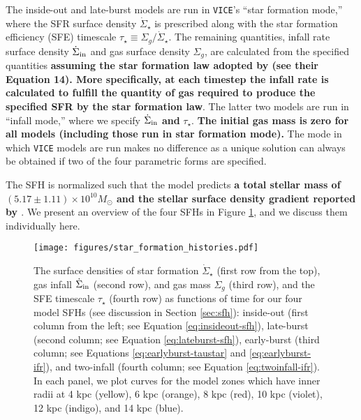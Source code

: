 \documentclass[twocolumn,twocolappendix,linenumbers]{aastex631}
\newcommand{\vice}{{\tt VICE}\xspace}
\begin{document}
The inside-out and late-burst models are run in \vice's ``star formation mode,'' where the SFR surface density $\dot\Sigma_\star$ is prescribed along with the star formation efficiency (SFE) timescale $\tau_\star\equiv \Sigma_g/\dot\Sigma_\star$. The remaining quantities, infall rate surface density $\dot\Sigma_{\rm in}$ and gas surface density $\Sigma_g$, are calculated from the specified quantities {\bf assuming the star formation law adopted by  (see their Equation 14). More specifically, at each timestep the infall rate is calculated to fulfill the quantity of gas required to produce the specified SFR by the star formation law}. The latter two models are run in ``infall mode,'' where we specify $\dot\Sigma_{\rm in}$ {\bf and} $\tau_\star$. {\bf The initial gas mass is zero for all models (including those run in star formation mode).} The mode in which \vice models are run makes no difference as a unique solution can always be obtained if two of the four parametric forms are specified. 

The SFH is normalized such that the model predicts {\bf a total stellar mass of $(5.17\pm1.11)\times10^{10} M_\odot$ \citep{LicquiaNewman2015-StellarMass} and the stellar surface density gradient reported by \citet[][see Appendix B of ]{BlandHawthornGerhard2016-MilkyWayReview}}.
We present an overview of the four SFHs in Figure \ref{fig:sfhs}, and we discuss them individually here.

\begin{figure*}
    \centering
    \texttt{[image: figures/star\_formation\_histories.pdf]}
    \caption{The surface densities of star formation $\dot \Sigma_\star$ (first row from the top), gas infall $\dot \Sigma_{\rm in}$ (second row), and gas mass $\Sigma_g$ (third row), and the SFE timescale $\tau_\star$ (fourth row) as functions of time for our four model SFHs (see discussion in Section \ref{sec:sfh}): inside-out (first column from the left; see Equation \ref{eq:insideout-sfh}), late-burst (second column; see Equation \ref{eq:lateburst-sfh}), early-burst (third column; see Equations \ref{eq:earlyburst-taustar} and \ref{eq:earlyburst-ifr}), and two-infall (fourth column; see Equation \ref{eq:twoinfall-ifr}). In each panel, we plot curves for the model zones which have inner radii at 4 kpc (yellow), 6 kpc (orange), 8 kpc (red), 10 kpc (violet), 12 kpc (indigo), and 14 kpc (blue).}
    \label{fig:sfhs}
\end{figure*}
\end{document}
